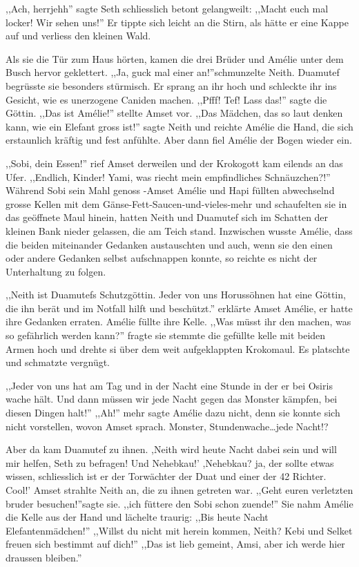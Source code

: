 \documentclass[11pt,titlepage,a5paper]{book}
\begin{document}
,,Ach, herrjehh'' sagte Seth schliesslich betont gelangweilt: ,,Macht euch mal locker! Wir sehen uns!'' Er tippte sich leicht an die Stirn, als hätte er eine Kappe auf und verliess den kleinen Wald.

Als sie die Tür zum Haus hörten, kamen die drei Brüder und Amélie unter dem Busch hervor geklettert. ,,Ja, guck mal einer an!''schmunzelte Neith. Duamutef begrüsste sie besonders stürmisch. Er sprang an ihr hoch und schleckte ihr ins Gesicht, wie es unerzogene Caniden machen. ,,Pfff! Tef! Lass das!'' sagte die Göttin. ,,Das ist Amélie!'' stellte Amset vor. ,,Das Mädchen, das so laut denken kann, wie ein Elefant gross ist!'' sagte Neith und reichte Amélie die Hand, die sich erstaunlich kräftig und fest anfühlte. Aber dann fiel Amélie der Bogen wieder ein.

,,Sobi, dein Essen!'' rief Amset derweilen und der Krokogott kam eilends an das Ufer. ,,Endlich, Kinder! Yami, was riecht mein empfindliches Schnäuzchen?!'' Während Sobi sein Mahl genoss -Amset Amélie und Hapi füllten abwechselnd grosse Kellen mit dem Gänse-Fett-Saucen-und-vieles-mehr und schaufelten sie in das geöffnete Maul hinein, hatten Neith und Duamutef sich im Schatten der kleinen Bank nieder gelassen, die am Teich stand. Inzwischen wusste Amélie, dass die beiden miteinander Gedanken austauschten und auch, wenn sie den einen oder andere Gedanken selbst aufschnappen konnte, so reichte es nicht der Unterhaltung zu folgen. 

,,Neith ist Duamutefs Schutzgöttin. Jeder von uns Horussöhnen hat eine Göttin, die ihn berät und im Notfall hilft und beschützt.'' erklärte Amset Amélie, er hatte ihre Gedanken erraten. Amélie füllte ihre Kelle. ,,Was müsst ihr den machen, was so gefährlich werden kann?'' fragte sie stemmte die gefüllte kelle mit beiden Armen hoch und drehte si über dem weit aufgeklappten Krokomaul. Es platschte und schmatzte vergnügt.
 
,,Jeder von uns hat am Tag und in der Nacht eine Stunde in der er bei Osiris wache hält. Und dann müssen wir jede Nacht gegen das Monster kämpfen, bei diesen Dingen halt!'' ,,Ah!'' mehr sagte Amélie dazu nicht, denn sie konnte sich nicht vorstellen, wovon Amset sprach. Monster, Stundenwache\dots jede Nacht!? 

Aber da kam Duamutef zu ihnen. ,Neith wird heute Nacht dabei sein und will mir helfen, Seth zu befragen! Und Nehebkau!' ,Nehebkau? ja, der sollte etwas wissen, schliesslich ist er der Torwächter der Duat und einer der 42 Richter. Cool!' Amset strahlte Neith an, die zu ihnen getreten war. ,,Geht euren verletzten bruder besuchen!''sagte sie. ,,ich füttere den Sobi schon zuende!'' Sie nahm Amélie die Kelle aus der Hand und lächelte traurig: ,,Bis heute Nacht Elefantenmädchen!'' ,,Willst du nicht mit herein kommen, Neith? Kebi und Selket freuen sich bestimmt auf dich!'' ,,Das ist lieb gemeint, Amsi, aber ich werde hier draussen bleiben.'' 
\end{document}
